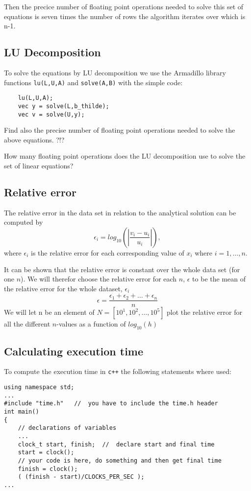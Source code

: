 \documentclass[11pt,a4wide]{article}
\begin{document}
Then the precice number of floating point operations needed to solve this set of equations is seven times the number of rows the algorithm iterates over which is n-1. 

\subsection{LU Decomposition}
To solve the equations by LU decomposition we use the Armadillo library functions \texttt{lu(L,U,A)} and \texttt{solve(A,B)} with the simple code:
\begin{lstlisting}
    lu(L,U,A);
    vec y = solve(L,b_thilde);
    vec v = solve(U,y);
\end{lstlisting}


Find also the precise number of floating point 
operations needed to solve the above equations. ?!?

How many floating point operations does the LU decomposition use to solve the set of linear equations?


\subsection{Relative error}
The relative error in the data set in relation to the analytical solution can be computed by 
\[
   \epsilon_i=log_{10}\left(\left|\frac{v_i-u_i}
                 {u_i}\right|\right),
\]
where $\epsilon_i$ is the relative error for each corresponding value of $x_i$ where $i=1,\dots, n$. 

It can be shown that the relative error is constant over the whole data set (for one $n$). We will therefor choose the relative error for each $n$, $\epsilon$ to be the mean of the relative error for the whole dataset, $\epsilon_i$
\[
\epsilon = \frac{\epsilon_1 + \epsilon_2 + \dots + \epsilon_n}{n}
\]
We will let n be an element of $N = [10^1, 10^2, \dots, 10^5]$ plot the relative error for all the different $n$-values as a function of $log_{10}(h)$ 




\subsection{Calculating execution time}
To compute the execution time in \texttt{c++} the following statements where used:
\begin{lstlisting}[title={Time in C++}]
using namespace std;
...
#include "time.h"   //  you have to include the time.h header
int main()
{
    // declarations of variables 
    ...
    clock_t start, finish;  //  declare start and final time
    start = clock();
    // your code is here, do something and then get final time
    finish = clock();
    ( (finish - start)/CLOCKS_PER_SEC );
...
\end{lstlisting}
\end{document}
